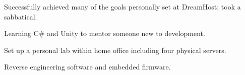 
\item Successfully achieved many of the goals personally set at DreamHost; took a sabbatical.
\item Learning C\# and Unity to mentor someone new to development.
\item Set up a personal lab within home office including four physical servers.
\item Reverse engineering software and embedded firmware.
